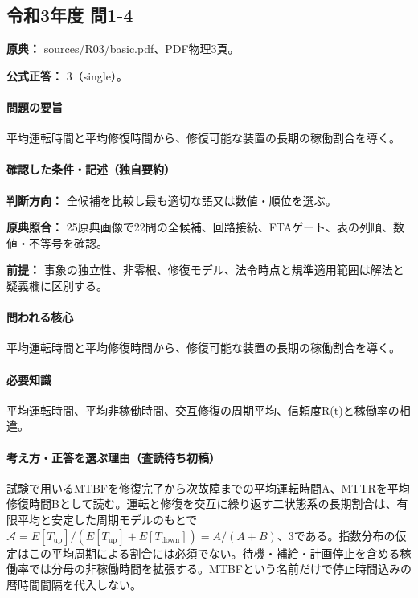 \subsection{令和3年度 問1-4}
\label{q:r03-reg-basic-1-4}

\noindent\textbf{原典：} sources/R03/basic.pdf、PDF物理3頁。

\textbf{公式正答：} 3（single）。

\paragraph{問題の要旨} 平均運転時間と平均修復時間から、修復可能な装置の長期の稼働割合を導く。

\paragraph{確認した条件・記述（独自要約）}\mbox{}\par

\noindent\textbf{判断方向：} 全候補を比較し最も適切な語又は数値・順位を選ぶ。\par

\noindent\textbf{原典照合：} 25原典画像で22問の全候補、回路接続、FTAゲート、表の列順、数値・不等号を確認。\par

\noindent\textbf{前提：} 事象の独立性、非零根、修復モデル、法令時点と規準適用範囲は解法と疑義欄に区別する。\par

\paragraph{問われる核心} 平均運転時間と平均修復時間から、修復可能な装置の長期の稼働割合を導く。

\paragraph{必要知識} 平均運転時間、平均非稼働時間、交互修復の周期平均、信頼度R(t)と稼働率の相違。

\paragraph{考え方・正答を選ぶ理由（査読待ち初稿）} 試験で用いるMTBFを修復完了から次故障までの平均運転時間A、MTTRを平均修復時間Bとして読む。運転と修復を交互に繰り返す二状態系の長期割合は、有限平均と安定した周期モデルのもとで \(\mathcal A=E[T_{\mathrm{up}}]/(E[T_{\mathrm{up}}]+E[T_{\mathrm{down}}])=A/(A+B)\)、3である。指数分布の仮定はこの平均周期による割合には必須でない。待機・補給・計画停止を含める稼働率では分母の非稼働時間を拡張する。MTBFという名前だけで停止時間込みの暦時間間隔を代入しない。

